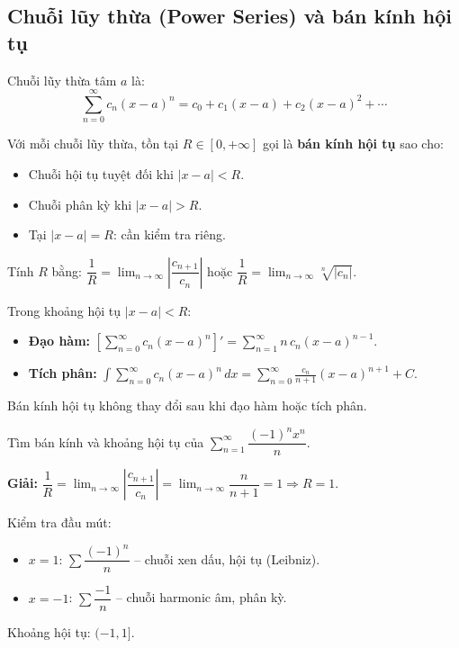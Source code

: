 \documentclass[12pt,a4paper]{article}
\begin{document}
\subsection{Chuỗi lũy thừa (Power Series) và bán kính hội tụ}

\begin{dinhnghia}[title={Chuỗi lũy thừa}]
  Chuỗi lũy thừa tâm $a$ là:
  \[
    \sum_{n=0}^\infty c_n (x-a)^n = c_0 + c_1(x-a) + c_2(x-a)^2 + \cdots
  \]
\end{dinhnghia}

\begin{dinhly}[title={Bán kính và khoảng hội tụ}]
  Với mỗi chuỗi lũy thừa, tồn tại $R \in [0, +\infty]$ gọi là \textbf{bán kính hội tụ} sao cho:
  \begin{itemize}
    \item Chuỗi hội tụ tuyệt đối khi $|x - a| < R$.
    \item Chuỗi phân kỳ khi $|x - a| > R$.
    \item Tại $|x - a| = R$: cần kiểm tra riêng.
  \end{itemize}
  Tính $R$ bằng: $\dfrac{1}{R} = \displaystyle\lim_{n\to\infty}\left|\dfrac{c_{n+1}}{c_n}\right|$ hoặc $\dfrac{1}{R} = \lim_{n\to\infty} \sqrt[n]{|c_n|}$.
\end{dinhly}

\begin{congthuc}[title={Đạo hàm và tích phân chuỗi lũy thừa}]
  Trong khoảng hội tụ $|x-a| < R$:
  \begin{itemize}
    \item \textbf{Đạo hàm:} $\displaystyle\left[\sum_{n=0}^\infty c_n(x-a)^n\right]' = \sum_{n=1}^\infty n\,c_n(x-a)^{n-1}$.
    \item \textbf{Tích phân:} $\displaystyle\int \sum_{n=0}^\infty c_n(x-a)^n\,dx = \sum_{n=0}^\infty \frac{c_n}{n+1}(x-a)^{n+1} + C$.
  \end{itemize}
  Bán kính hội tụ không thay đổi sau khi đạo hàm hoặc tích phân.
\end{congthuc}

\begin{vidu}
  Tìm bán kính và khoảng hội tụ của $\displaystyle\sum_{n=1}^\infty \dfrac{(-1)^n x^n}{n}$.

  \medskip\textbf{Giải:}
  $\dfrac{1}{R} = \displaystyle\lim_{n\to\infty}\left|\dfrac{c_{n+1}}{c_n}\right| = \lim_{n\to\infty} \dfrac{n}{n+1} = 1 \Rightarrow R = 1$.

  Kiểm tra đầu mút:
  \begin{itemize}
    \item $x = 1$: $\displaystyle\sum \dfrac{(-1)^n}{n}$ -- chuỗi xen dấu, hội tụ (Leibniz).
    \item $x = -1$: $\displaystyle\sum \dfrac{-1}{n}$ -- chuỗi harmonic âm, phân kỳ.
  \end{itemize}
  Khoảng hội tụ: $(-1, 1]$.
\end{vidu}
\end{document}
